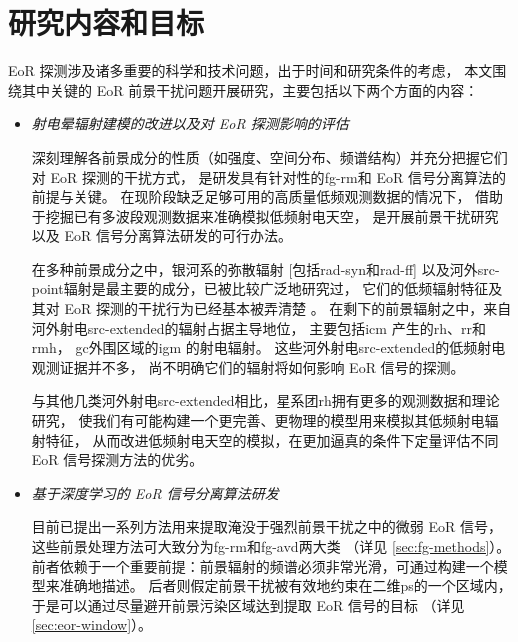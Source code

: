 \section{研究内容和目标}

EoR 探测涉及诸多重要的科学和技术问题，出于时间和研究条件的考虑，
本文围绕其中关键的 EoR 前景干扰问题开展研究，主要包括以下两个方面的内容：

\begin{itemize}
\item \emph{射电晕辐射建模的改进以及对 EoR 探测影响的评估}

\hspace{2\ccwd}%
深刻理解各前景成分的性质（如强度、空间分布、频谱结构）并充分把握它们对 EoR 探测的干扰方式，
是研发具有针对性的\ac{fg-rm}和 EoR 信号分离算法的前提与关键。
在现阶段缺乏足够可用的高质量低频观测数据的情况下，
借助于挖掘已有多波段观测数据来准确模拟低频射电天空，
是开展前景干扰研究以及 EoR 信号分离算法研发的可行办法。

\hspace{2\ccwd}%
在多种前景成分之中，银河系的弥散辐射 [包括\ac{rad-syn}和\ac{rad-ff}]
以及河外\ac{src-point}辐射是最主要的成分，已被比较广泛地研究过，
它们的低频辐射特征及其对 EoR 探测的干扰行为已经基本被弄清楚
\cite{shaver1999,diMatteo2004,gleser2008,liu2012,murray2017,spinelli2018}。
在剩下的前景辐射之中，来自河外射电\ac{src-extended}的辐射占据主导地位，
主要包括\ac{icm} \cite{feretti2012} 产生的\ac{rh}、\ac{rr}和\ac{rmh}，
\ac{gc}外围区域的\ac{igm} 的射电辐射\cite{keshet2004}。
这些河外射电\ac{src-extended}的低频射电观测证据并不多，
尚不明确它们的辐射将如何影响 EoR 信号的探测。

\hspace{2\ccwd}%
与其他几类河外射电\ac{src-extended}相比，星系团\ac{rh}拥有更多的观测数据和理论研究，
使我们有可能构建一个更完善、更物理的模型用来模拟其低频射电辐射特征，
从而改进低频射电天空的模拟，在更加逼真的条件下定量评估不同 EoR 信号探测方法的优劣。

\item \emph{基于深度学习的 EoR 信号分离算法研发}

\hspace{2\ccwd}%
目前已提出一系列方法用来提取淹没于强烈前景干扰之中的微弱 EoR 信号，
这些前景处理方法可大致分为\ac{fg-rm}和\ac{fg-avd}两大类 \cite{chapman2016}
（详见 \autoref{sec:fg-methods}）。
前者依赖于一个重要前提：前景辐射的频谱必须非常光滑，可通过构建一个模型来准确地描述。
后者则假定前景干扰被有效地约束在二维\ac{ps}的一个区域内，
于是可以通过尽量避开前景污染区域达到提取 EoR 信号的目标
（详见 \autoref{sec:eor-window}）。


\end{itemize}
